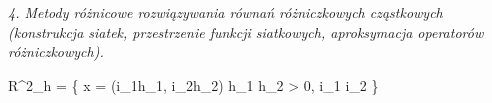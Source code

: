 \textit{4. Metody różnicowe rozwiązywania równań różniczkowych cząstkowych (konstrukcja siatek, przestrzenie funkcji siatkowych, aproksymacja operatorów różniczkowych).}


R^{2}_{h} = \{ x = (i_1h_1, i_2h_2) h_1 h_2 > 0, i_1 i_2 \in {}\}